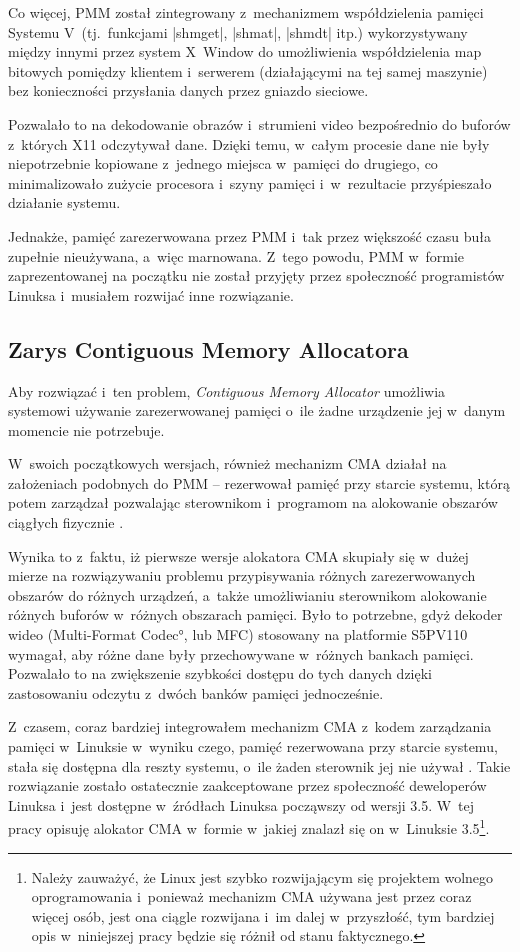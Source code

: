 Co więcej, PMM został zintegrowany z~mechanizmem współdzielenia
pamięci Systemu V~(tj.\ funkcjami \code|shmget|,
\code|shmat|, \code|shmdt| itp.) wykorzystywany między
innymi przez system X~Window do umożliwienia współdzielenia map
bitowych pomiędzy klientem i~serwerem (działającymi na tej samej
maszynie) bez konieczności przysłania danych przez gniazdo sieciowe.

Pozwalało to na dekodowanie obrazów i~strumieni video bezpośrednio do
buforów z~których X11 odczytywał dane.  Dzięki temu, w~całym procesie
dane nie były niepotrzebnie kopiowane z~jednego miejsca w~pamięci do
drugiego, co minimalizowało zużycie procesora i~szyny pamięci
i~w~rezultacie przyśpieszało działanie systemu.

Jednakże, pamięć zarezerwowana przez PMM i~tak przez większość czasu
buła zupełnie nieużywana, a~więc marnowana.  Z~tego powodu, PMM
w~formie zaprezentowanej na początku nie został przyjęty przez
społeczność programistów Linuksa i~musiałem rozwijać inne rozwiązanie.

\subsection{Zarys Contiguous Memory Allocatora}

Aby rozwiązać i~ten problem, {\it Contiguous Memory Allocator}
umożliwia systemowi używanie zarezerwowanej pamięci o~ile żadne
urządzenie jej w~danym momencie nie potrzebuje.

W~swoich początkowych wersjach, również mechanizm CMA działał na
założeniach podobnych do PMM -- rezerwował pamięć przy starcie
systemu, którą potem zarządzał pozwalając sterownikom i~programom na
alokowanie obszarów ciągłych fizycznie \cite{patch:cma-4}.

Wynika to z~faktu, iż pierwsze wersje alokatora CMA skupiały się
w~dużej mierze na rozwiązywaniu problemu przypisywania różnych
zarezerwowanych obszarów do różnych urządzeń, a~także umożliwianiu
sterownikom alokowanie różnych buforów w~różnych obszarach pamięci.
Było to potrzebne, gdyż dekoder wideo (\ang{Multi-Format Codec}, lub
MFC) stosowany na platformie S5PV110 wymagał, aby różne dane były
przechowywane w~różnych bankach pamięci.  Pozwalało to na zwiększenie
szybkości dostępu do tych danych dzięki zastosowaniu odczytu z~dwóch
banków pamięci jednocześnie.

Z~czasem, coraz bardziej integrowałem mechanizm CMA z~kodem
zarządzania pamięci w~Linuksie w~wyniku czego, pamięć rezerwowana przy
starcie systemu, stała się dostępna dla reszty systemu, o~ile żaden
sterownik jej nie używał \cite{patch:cma-24}.  Takie rozwiązanie
zostało ostatecznie zaakceptowane przez społeczność deweloperów
Linuksa i~jest dostępne w~źródłach Linuksa począwszy od wersji 3.5.
W~tej pracy opisuję alokator CMA w~formie w~jakiej znalazł się on
w~Linuksie 3.5\footnote{Należy zauważyć, że Linux jest szybko
  rozwijającym się projektem wolnego oprogramowania i~ponieważ
  mechanizm CMA używana jest przez coraz więcej osób, jest ona ciągle
  rozwijana i~im dalej w~przyszłość, tym bardziej opis w~niniejszej
  pracy będzie się różnił od stanu faktycznego.}.

